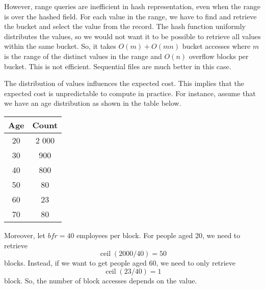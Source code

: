 \documentclass[a4paper, openany]{memoir}
\begin{document}
However, range queries are inefficient in hash representation, even when the range is over the hashed field. For each value in the range, we have to find and retrieve the bucket and select the value from the record. The hash function uniformly distributes the values, so we would not want it to be possible to retrieve all values within the same bucket. So, it takes $O(m) + O(mn)$ bucket accesses where $m$ is the range of the distinct values in the range and $O(n)$ overflow blocks per bucket. This is not efficient. Sequential files are much better in this case.

The distribution of values influences the expected cost. This implies that the expected cost is unpredictable to compute in practice. For instance, assume that we have an age distribution as shown in the table below.
\begin{table}[H]
    \centering
    \begin{tabular}{|c|c|}
        \hline
        Age & Count \\
        \hline
        20 & 2 000 \\
        30 & 900 \\
        40 & 800 \\
        50 & 80 \\
        60 & 23 \\
        70 & 80 \\
        \hline
    \end{tabular}
\end{table}
\noindent Moreover, let $\textit{bfr} = 40$ employees per block. For people aged 20, we need to retrieve
\[\operatorname{ceil}(2000/40) = 50\]
blocks. Instead, if we want to get people aged 60, we need to only retrieve
\[\operatorname{ceil}(23/40) = 1\]
block. So, the number of block accesses depends on the value.
\end{document}
